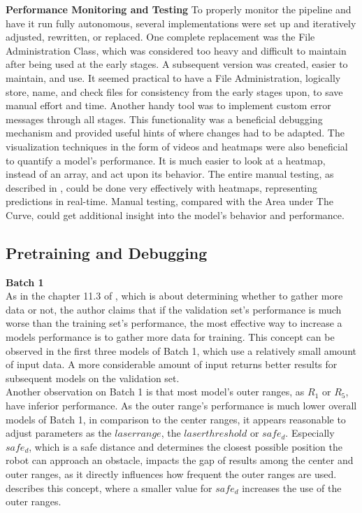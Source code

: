 \textbf{Performance Monitoring and Testing} To properly monitor the pipeline and have it run fully autonomous, several implementations were set up and iteratively adjusted, rewritten, or replaced. One complete replacement was the File Administration Class, which was considered too heavy and difficult to maintain after being used at the early stages. A subsequent version was created, easier to maintain, and use. It seemed practical to have a File Administration, logically store, name, and check files for consistency from the early stages upon, to save manual effort and time. Another handy tool was to implement custom error messages through all stages. This functionality was a beneficial debugging mechanism and provided useful hints of where changes had to be adapted. The visualization techniques in the form of videos and heatmaps were also beneficial to quantify a model's performance. It is much easier to look at a heatmap, instead of an array, and act upon its behavior. The entire manual testing, as described in , could be done very effectively with heatmaps, representing predictions in real-time. Manual testing, compared with the Area under The Curve, could get additional insight into the model's behavior and performance.

\subsection{Pretraining and Debugging \label{pretraining}}

\textbf{Batch 1}\\
As in the chapter  11.3 of \cite{Goodfellow-et-al-2016}, which is about determining whether to gather more data or not, the author claims that if the validation set's performance is much worse than the training set's performance, the most effective way to increase a models performance is to gather more data for training. This concept can be observed in the first three models of Batch 1, which use a relatively small amount of input data. A more considerable amount of input returns better results for subsequent models on the validation set.\\

Another observation on Batch 1 is that most model's outer ranges, as $R_{1}$ or $R_{5}$, have inferior performance. As the outer range's performance is much lower overall models of Batch 1, in comparison to the center ranges, it appears reasonable to adjust parameters as the $laser range $, the $laser threshold$ or $safe_{d}$. Especially $safe_{d}$, which is a safe distance and determines the closest possible position the robot can approach an obstacle, impacts the gap of results among the center and outer ranges, as it directly influences how frequent the outer ranges are used.  describes this concept, where a smaller value for $safe_{d}$ increases the use of the outer ranges.\\

